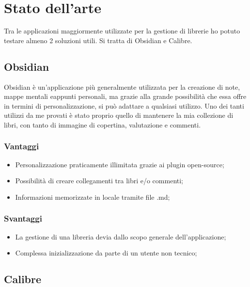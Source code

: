 \newpage
\section{Stato dell'arte}

Tra le applicazioni maggiormente utilizzate per la gestione di librerie
ho potuto testare almeno 2 soluzioni utili. Si tratta di
Obsidian e Calibre.

\subsection{Obsidian}

Obsidian è un'applicazione più generalmente utilizzata per la creazione
di note, mappe mentali eappunti personali, ma grazie alla grande
possibilità che essa offre in termini di personalizzazione, si può
adattare a qualsiasi utilizzo. Uno dei tanti utilizzi da me provati è
stato proprio quello di mantenere la mia collezione di libri, con tanto
di immagine di copertina, valutazione e commenti.

\subsubsection{Vantaggi}

\begin{itemize}
  \item
    Personalizzazione praticamente illimitata grazie ai plugin
    open-source;
  \item
    Possibilità di creare collegamenti tra libri e/o commenti;
  \item
    Informazioni memorizzate in locale tramite file .md;
\end{itemize}

\subsubsection{Svantaggi}

\begin{itemize}
  \item
    La gestione di una libreria devia dallo scopo generale
    dell'applicazione;
  \item
    Complessa inizializzazione da parte di un utente non tecnico;
\end{itemize}

\subsection{Calibre}

